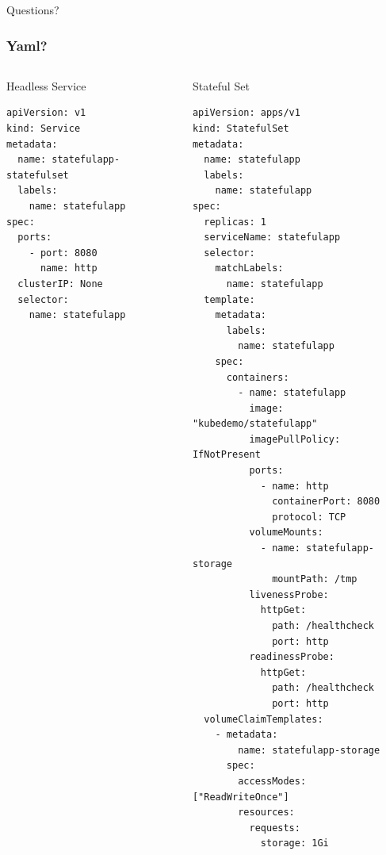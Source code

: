 \documentclass{beamer}
\begin{document}
\begin{frame}
    \begin{center}
        \Huge Questions?
    \end{center}
\end{frame}

\begin{frame}[fragile]
\frametitle{Yaml?}
\begin{columns}[t]
    \begin{block}{Headless Service}
    \begin{verbatim}
apiVersion: v1
kind: Service
metadata:
  name: statefulapp-statefulset
  labels:
    name: statefulapp
spec:
  ports:
    - port: 8080
      name: http
  clusterIP: None
  selector:
    name: statefulapp
    \end{verbatim}
    \end{block}

    \begin{block}{Stateful Set}
    \begin{verbatim}
apiVersion: apps/v1
kind: StatefulSet
metadata:
  name: statefulapp
  labels:
    name: statefulapp
spec:
  replicas: 1
  serviceName: statefulapp
  selector:
    matchLabels:
      name: statefulapp
  template:
    metadata:
      labels:
        name: statefulapp
    spec:
      containers:
        - name: statefulapp
          image: "kubedemo/statefulapp"
          imagePullPolicy: IfNotPresent
          ports:
            - name: http
              containerPort: 8080
              protocol: TCP
          volumeMounts:
            - name: statefulapp-storage
              mountPath: /tmp
          livenessProbe:
            httpGet:
              path: /healthcheck
              port: http
          readinessProbe:
            httpGet:
              path: /healthcheck
              port: http
  volumeClaimTemplates:
    - metadata:
        name: statefulapp-storage
      spec:
        accessModes: ["ReadWriteOnce"]
        resources:
          requests:
            storage: 1Gi
    \end{verbatim}
    \end{block}
\end{columns}
\end{frame}
\end{document}
